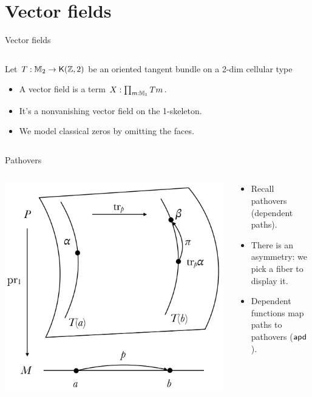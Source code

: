\section{Vector fields}
\begin{frame}{Vector fields}
\begin{columns}
\begin{column}{0.7\textwidth}
Let \( T:\mathbb{M}_2\to\mathsf{K}(\mathbb{Z},2) \) be an oriented tangent bundle on a 2-dim cellular type
\begin{itemize}
\item A \alert{vector field} is a term \alert{\( X:\prod_{m:\mathbb{M}_1}Tm \)}.
\item It's a \alert{nonvanishing} vector field on the 1-skeleton.
\item We model classical zeros by omitting the faces.
\end{itemize}
\end{column}
\begin{column}{0.3\textwidth}

\end{column}
\end{columns}
\end{frame}

\begin{frame}{Pathovers}
\begin{columns}
\begin{column}{0.55\textwidth}
\includegraphics[width=30ex]{figs/pathovers.pdf}
\end{column}
\begin{column}{0.45\textwidth}
\begin{itemize}
\item Recall pathovers (dependent paths).
\item There is an asymmetry: we pick a fiber to display it.
\item Dependent functions map paths to pathovers (\( \mathsf{apd} \)).
\end{itemize}
\end{column}
\end{columns}
\end{frame}

